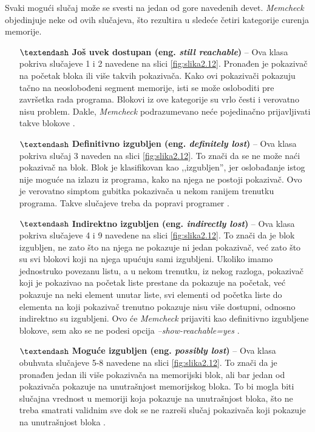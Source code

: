 \documentclass[12pt,oneside]{memoir}
\theoremstyle{plain}
\theoremstyle{definition}
\begin{document}
Svaki mogući slučaj može se svesti na jedan od gore navedenih devet. \textit{Memcheck} objedinjuje neke od ovih slučajeva, što rezultira u sledeće četiri kategorije curenja memorije.
\begin{itemize}
\item[$\textendash$] \textbf{Još uvek dostupan (eng. \textit{still reachable})} – Ova klasa pokriva slučajeve 1 i 2 navedene na slici \ref{fig:slika2.12}. Pronađen je pokazivač na početak bloka ili više takvih pokazivača. Kako ovi pokazivači pokazuju tačno na neoslobođeni segment memorije, isti se može osloboditi pre završetka rada programa. Blokovi iz ove kategorije su vrlo česti i verovatno nisu problem. Dakle, \textit{Memcheck} podrazumevano neće pojedinačno prijavljivati takve blokove \cite{ValgrindDOC}.
\item[$\textendash$] \textbf{Definitivno izgubljen (eng. \textit{definitely lost})} – Ova klasa pokriva slučaj 3 naveden na slici \ref{fig:slika2.12}. To znači da se ne može naći pokazivač na blok. Blok je klasifikovan kao ,,izgubljen'', jer oslobađanje istog nije moguće na izlazu iz programa, kako na njega ne postoji pokazivač. Ovo je verovatno simptom gubitka pokazivača u nekom ranijem trenutku programa. Takve slučajeve treba da popravi programer \cite{ValgrindDOC}.
\item[$\textendash$] \textbf{Indirektno izgubljen (eng. \textit{indirectly lost})} – Ova klasa pokriva slučajeve 4 i 9 navedene na slici \ref{fig:slika2.12}. To znači da je blok izgubljen, ne zato što na njega ne pokazuje ni jedan pokazivač, već zato što su svi blokovi koji na njega upućuju sami izgubljeni. Ukoliko imamo jednostruko povezanu listu, a u nekom trenutku, iz nekog razloga, pokazivač koji je pokazivao na početak liste prestane da pokazuje na početak, već pokazuje na neki element unutar liste, svi elementi od početka liste do elementa na koji pokazivač trenutno pokazuje nisu više dostupni, odnosno indirektno su izgubljeni. Ovo će \textit{Memcheck} prijaviti kao definitivno izgubljene blokove, sem ako se ne podesi opcija \textit{–show-reachable=yes} \cite{ValgrindDOC}.
\item[$\textendash$] \textbf{Moguće izgubljen (eng. \textit{possibly lost})} – Ova klasa obuhvata slučajeve 5-8 navedene na slici \ref{fig:slika2.12}. To znači da je pronađen jedan ili više pokazivača na memorijski blok, ali bar jedan od pokazivača pokazuje na unutrašnjost memorijskog bloka. To bi mogla biti  slučajna vrednost u memoriji koja pokazuje na unutrašnjost bloka, što ne treba smatrati validnim sve dok se ne razreši slučaj pokazivača koji pokazuje na unutrašnjost bloka \cite{ValgrindDOC}.
\end{itemize}
\end{document}

